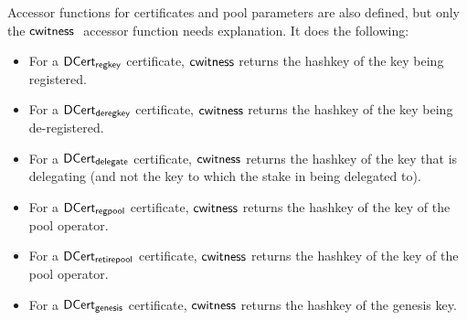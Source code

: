 Accessor functions for certificates and pool parameters are also defined, but
only the $\mathsf{cwitness}~ \mathit{}$ accessor function needs explanation.
It does the following:
\begin{itemize}
  \item For a $\mathsf{DCert_{regkey}}$ certificate, $\mathsf{cwitness}$ returns the hashkey
  of the key being registered.
\item For a $\mathsf{DCert_{deregkey}}$ certificate, $\mathsf{cwitness}$ returns the hashkey
  of the key being de-registered.
\item For a $\mathsf{DCert_{delegate}}$ certificate, $\mathsf{cwitness}$ returns the hashkey
  of the key that is delegating (and not the key to which the stake in being delegated to).
\item For a $\mathsf{DCert_{regpool}}$ certificate, $\mathsf{cwitness}$ returns the hashkey
  of the key of the pool operator.
\item For a $\mathsf{DCert_{retirepool}}$ certificate, $\mathsf{cwitness}$ returns the hashkey
  of the key of the pool operator.
\item For a $\mathsf{DCert_{genesis}}$ certificate, $\mathsf{cwitness}$ returns the hashkey
  of the genesis key.
\end{itemize}


